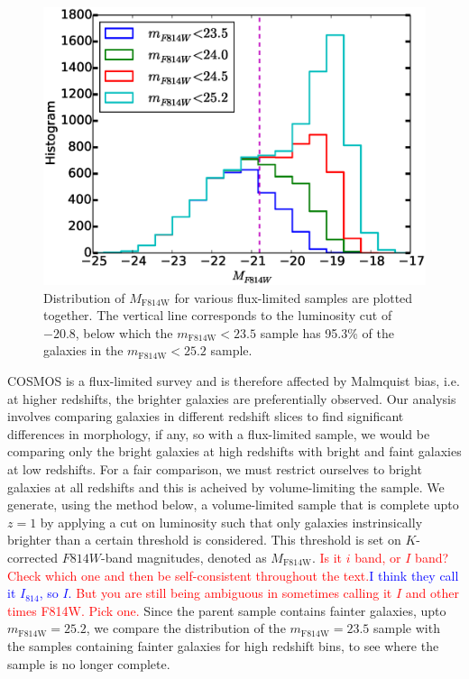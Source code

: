 \documentclass[twocolumn,useAMS,usenatbib]{mn2e}
\newcommand{\rachel}[1]{{\textcolor{red}{#1}}}
\newcommand{\arun}[1]{{\textcolor{blue}{#1}}}
\begin{document}
\begin{figure}
  \centering
   \includegraphics[width=\columnwidth]{MAG_histograms}
   \caption{Distribution of $M_\text{F814W}$ for various flux-limited samples are plotted together. The vertical line corresponds to the luminosity cut of $-20.8$, below which the $m_\text{F814W}<23.5$ sample has 95.3\% of the galaxies in the $m_\text{F814W}<25.2$ sample.}
   \label{fig:2Dhist}
 \end{figure}
 
COSMOS is a flux-limited survey and is therefore affected by Malmquist bias, i.e. at higher redshifts, the brighter galaxies are preferentially observed.
Our analysis involves comparing galaxies in different redshift slices to find significant differences in morphology, if any, so with a flux-limited sample, we would be comparing only the bright galaxies at high redshifts with
bright and faint galaxies at low redshifts. For a fair comparison, we must restrict ourselves to bright galaxies at all redshifts and this is acheived by volume-limiting the sample.
We generate, using the method below, a volume-limited sample that is complete upto $z=1$ by applying a cut on luminosity such that only galaxies instrinsically brighter than a certain threshold is considered. This threshold is set on $K$-corrected $F814W$-band magnitudes, denoted as $M_\text{F814W}$.
\rachel{Is it $i$ band, or $I$ band?  Check which one and then be
  self-consistent throughout the text.}\arun{I think they call it
  $I_{814}$, so $I$.}
\rachel{But you are still being ambiguous in sometimes calling it $I$
  and other times F814W.  Pick one.}
Since the parent sample contains fainter galaxies, upto $m_\text{F814W}=25.2$, we compare the distribution of the $m_\text{F814W}=23.5$ sample with the samples containing fainter galaxies for high redshift bins, to see where the sample is no longer complete.
\end{document}
